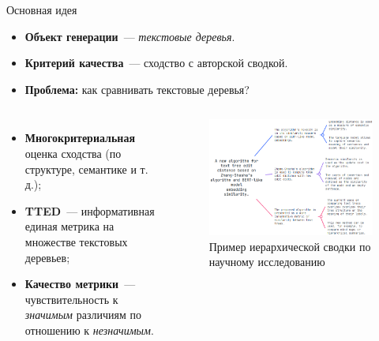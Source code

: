 \documentclass{beamer}
\begin{document}
\begin{frame}{Основная идея}

\begin{itemize}
    \item \textbf{Объект генерации}~--- \textit{текстовые деревья}.
    \item \textbf{Критерий качества}~--- сходство с авторской сводкой.
    \item \textbf{Проблема:} как сравнивать текстовые деревья?
\end{itemize}

\begin{columns}
        \begin{itemize}
            \item \textbf{Многокритериальная} оценка сходства (по структуре, семантике и т.\,д.);
            \item \textbf{TTED}~--- информативная единая метрика на множестве текстовых деревьев;
            \item \textbf{Качество метрики}~--- чувствительность к \textit{значимым} различиям по отношению к \textit{незначимым}.
        \end{itemize}
    
    \begin{figure}
        \centering
        \includegraphics[width=\linewidth]{img/map_example.png}
        \caption{Пример иерархической сводки по научному исследованию}
        \label{fig:map_example}
    \end{figure}
\end{columns}

\end{frame}
\end{document}
